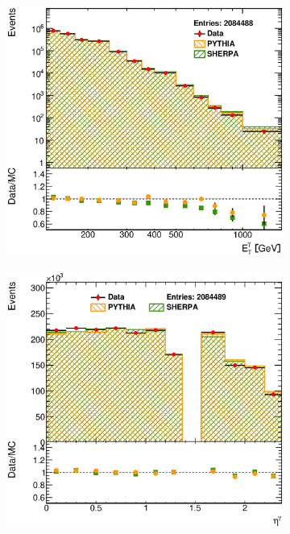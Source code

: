 \documentclass[12pt, twoside]{article}
\numberwithin{equation}{section}
\numberwithin{figure}{section}
\newenvironment{changemargin}[2]{%
\begin{list}{}{%
\setlength{\topsep}{0pt}%
\setlength{\leftmargin}{#1}%
\setlength{\rightmargin}{#2}%
\setlength{\listparindent}{\parindent}%
\setlength{\itemindent}{\parindent}%
\setlength{\parsep}{\parskip}%
}%
\item[]}{\end{list}}
\begin{document}
\begin{figure}
    \centering
    \checkoddpage
    \ifoddpage
        \begin{changemargin}{-1.0cm}{-0.75cm}
    \else
        \begin{changemargin}{-0.75cm}{-1.0cm}
    \fi
        \begin{subfigure}[b]{0.37\textwidth}
            \includegraphics[width=\textwidth]{./images/Results(Default)/DEF-101.eps}
            \subcaption{}
            \label{fig:DefaultEtPhoton}
        \end{subfigure}
        \begin{subfigure}[b]{0.37\textwidth}
            \includegraphics[width=\textwidth]{./images/Results(Default)/DEF-102.eps}

\end{subfigure}
\end{changemargin}
\end{changemargin}
\end{figure}
\end{document}
